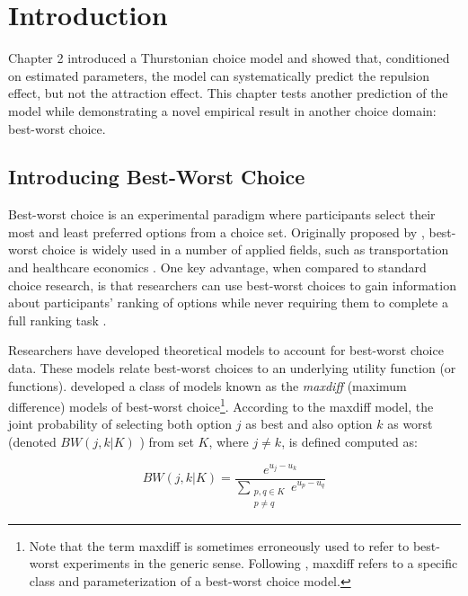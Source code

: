 \section{Introduction}

Chapter 2 introduced a Thurstonian choice model and showed that, conditioned on estimated parameters, the model can systematically predict the repulsion effect, but not the attraction effect. This chapter tests another prediction of the model while demonstrating a novel empirical result in another choice domain: best-worst choice.

\subsection{Introducing Best-Worst Choice}

Best-worst choice is an experimental paradigm where participants select their most and least preferred options from a choice set. Originally proposed by \textcite{finn1992determining}, best-worst choice is widely used in a number of applied fields, such as transportation \parencite{beck2016best} and healthcare economics \parencite{cheung2016using,flynn2007best,muhlbacher2016experimental}. One key advantage, when compared to standard choice research, is that researchers can use best-worst choices to gain information about participants' ranking of options while never requiring them to complete a full ranking task \parencite{flynn2014best}.

Researchers have developed theoretical models to account for best-worst choice data. These models relate best-worst choices to an underlying utility function (or functions). \textcite{marleyProbabilisticModelsBest2005} developed a class of models known as the \textit{maxdiff} (maximum difference) models of best-worst choice\footnote{Note that the term maxdiff is sometimes erroneously used to refer to best-worst experiments in the generic sense. Following \textcite{marleyProbabilisticModelsBest2005}, maxdiff refers to a specific class and parameterization of a best-worst choice model.}. According to the maxdiff model, the joint probability of selecting both option $j$ as best and also option $k$ as worst (denoted $BW(j,k|K)$ ) from set $K$, where $j \neq k$, is defined computed as:

\begin{equation}
   BW(j,k|K)=\frac{e^{u_{j}-u_{k}}}{\sum_{\substack{{p,q}\in K\\p \neq q}} e^{u_{p}-u_{q}}}   
   \label{eqn:maxdiff_equation_joint}
\end{equation}


